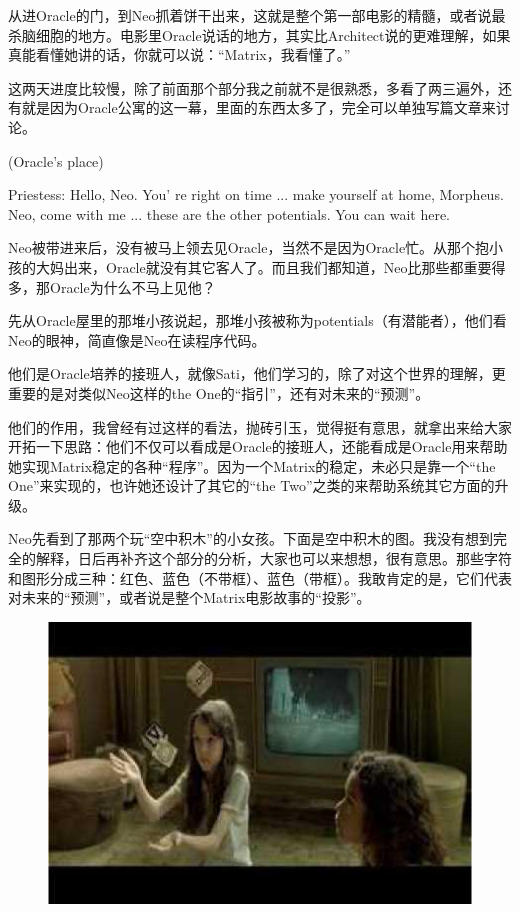 \documentclass{ctexart}
\newenvironment{myquote}{\color{green} \setlength{\leftskip}{6em} \setlength{\rightskip}{4em} \setlength{\parindent}{-2em}}{\par}
\begin{document}
从进Oracle的门，到Neo抓着饼干出来，这就是整个第一部电影的精髓，或者说最杀脑细胞的地方。电影里Oracle说话的地方，其实比Architect说的更难理解，如果真能看懂她讲的话，你就可以说：“Matrix，我看懂了。”

这两天进度比较慢，除了前面那个部分我之前就不是很熟悉，多看了两三遍外，还有就是因为Oracle公寓的这一幕，里面的东西太多了，完全可以单独写篇文章来讨论。

\begin{myquote}
(Oracle's place)

Priestess: Hello, Neo. You' re right on time ... make yourself at home, Morpheus. Neo, come with me ... these are the other potentials. You can wait here.
\end{myquote}

Neo被带进来后，没有被马上领去见Oracle，当然不是因为Oracle忙。从那个抱小孩的大妈出来，Oracle就没有其它客人了。而且我们都知道，Neo比那些都重要得多，那Oracle为什么不马上见他？

先从Oracle屋里的那堆小孩说起，那堆小孩被称为potentials（有潜能者），他们看Neo的眼神，简直像是Neo在读程序代码。

他们是Oracle培养的接班人，就像Sati，他们学习的，除了对这个世界的理解，更重要的是对类似Neo这样的the One的“指引”，还有对未来的“预测”。

他们的作用，我曾经有过这样的看法，抛砖引玉，觉得挺有意思，就拿出来给大家开拓一下思路：他们不仅可以看成是Oracle的接班人，还能看成是Oracle用来帮助她实现Matrix稳定的各种“程序”。因为一个Matrix的稳定，未必只是靠一个“the One”来实现的，也许她还设计了其它的“the Two”之类的来帮助系统其它方面的升级。

Neo先看到了那两个玩“空中积木”的小女孩。下面是空中积木的图。我没有想到完全的解释，日后再补齐这个部分的分析，大家也可以来想想，很有意思。那些字符和图形分成三种：红色、蓝色（不带框）、蓝色（带框）。我敢肯定的是，它们代表对未来的“预测”，或者说是整个Matrix电影故事的“投影”。

\begin{figure}[htb]
\centering
\includegraphics[width=0.5\linewidth]{fig/read_Matrix-43}
\end{figure}
\end{document}
